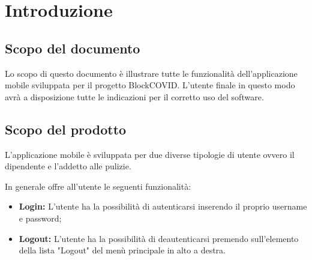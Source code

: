 \section{Introduzione}

\subsection{Scopo del documento}
Lo scopo di questo documento è illustrare tutte le funzionalità dell'applicazione mobile sviluppata per il progetto BlockCOVID. L'utente finale in questo modo avrà a disposizione tutte le indicazioni per il corretto uso del software.
\subsection{Scopo del prodotto}
L'applicazione mobile è sviluppata per due diverse tipologie di utente ovvero il dipendente e l'addetto alle pulizie.

In generale offre all'utente le seguenti funzionalità:
\begin{itemize}
	\item \textbf{Login:} L'utente ha la possibilità di autenticarsi inserendo il proprio username e password; \\
	\item \textbf{Logout:} L'utente ha la possibilità di deautenticarsi premendo sull'elemento della lista "Logout" del menù principale in alto a destra. \\
\end{itemize}

